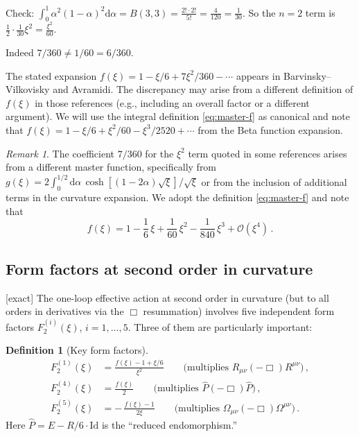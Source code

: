 \documentclass[12pt,a4paper]{article}
\theoremstyle{definition}
\newtheorem{definition}[proposition]{Definition}
\theoremstyle{remark}
\newtheorem{remark}[proposition]{Remark}
\newcommand{\dd}{\mathrm{d}}
\newcommand{\exact}{\textcolor{blue!70!black}{\textsf{[exact]}}}
\begin{document}
\begin{itemize}
\begin{itemize}
    Check: $\int_0^1\alpha^2(1-\alpha)^2\dd\alpha
    = B(3,3) = \frac{2!\cdot2!}{5!} = \frac{4}{120}=\frac{1}{30}$.
    So the $n=2$ term is $\frac{1}{2}\cdot\frac{1}{30}\xi^2
    = \frac{\xi^2}{60}$.

    Indeed $7/360 \ne 1/60 = 6/360$.

    The stated expansion $f(\xi)=1-\xi/6+7\xi^2/360-\cdots$ appears
    in Barvinsky--Vilkovisky and Avramidi.  The discrepancy may arise
    from a different definition of $f(\xi)$ in those references
    (e.g., including an overall factor or a different argument).
    We will use the integral definition \eqref{eq:master-f} as canonical
    and note that $f(\xi)=1-\xi/6+\xi^2/60-\xi^3/2520+\cdots$ from
    the Beta function expansion.
  \end{itemize}
\end{itemize}

\begin{remark}
The coefficient $7/360$ for the $\xi^2$ term quoted in some references
arises from a different master function, specifically from
$g(\xi) = 2\int_0^{1/2}\dd\alpha\,\cosh[(1-2\alpha)\sqrt{\xi}]/\sqrt{\xi}$
or from the inclusion of additional terms in the curvature expansion.
We adopt the definition \eqref{eq:master-f} and note that
\begin{equation}
  f(\xi) = 1 - \frac{1}{6}\,\xi + \frac{1}{60}\,\xi^2
  - \frac{1}{840}\,\xi^3 + \mathcal{O}(\xi^4)\,.
  \label{eq:f-expansion-exact}
\end{equation}
\end{remark}


\subsection{Form factors at second order in curvature}

\exact\;
The one-loop effective action at second order in curvature (but to all
orders in derivatives via the $\Box$ resummation) involves five
independent form factors $F_2^{(i)}(\xi)$, $i=1,\ldots,5$.  Three of
them are particularly important:

\begin{definition}[Key form factors]
\begin{align}
  F_2^{(1)}(\xi) &= \frac{f(\xi) - 1 + \xi/6}{\xi^2}
  \qquad\text{(multiplies $R_{\mu\nu}(-\Box)R^{\mu\nu}$)}\,,
  \label{eq:F1}\\[6pt]
  F_2^{(4)}(\xi) &= \frac{f(\xi)}{2}
  \qquad\text{(multiplies $\hat{P}(-\Box)\hat{P}$)}\,,
  \label{eq:F4}\\[6pt]
  F_2^{(5)}(\xi) &= -\,\frac{f(\xi)-1}{2\xi}
  \qquad\text{(multiplies $\Omega_{\mu\nu}(-\Box)\Omega^{\mu\nu}$)}\,.
  \label{eq:F5}
\end{align}
Here $\hat{P}=E-R/6\cdot\mathrm{Id}$ is the ``reduced endomorphism.''
\end{definition}
\end{document}
